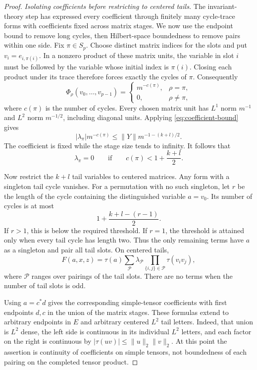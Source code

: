 \begin{proof}
\smallskip\noindent
\emph{Isolating coefficients before restricting to centered tails.}
The invariant-theory step has expressed every coefficient through
finitely many cycle-trace forms with coefficients fixed across matrix
stages. We now use the endpoint bound to remove long cycles, then
Hilbert-space boundedness to remove pairs within one side.
Fix $\pi\in S_p$.  Choose distinct matrix indices for the slots and
put $v_i=e_{i,\pi(i)}$.  In a nonzero product of these matrix units,
the variable in slot $i$ must be followed by the variable whose
initial index is $\pi(i)$.  Closing each product under its trace
therefore forces exactly the cycles of $\pi$.  Consequently
\[
 \Phi_\rho(v_0,\ldots,v_{p-1})
  =\begin{cases}
      m^{-c(\pi)},&\rho=\pi,\\
      0,&\rho\ne\pi,
    \end{cases}
\]
where $c(\pi)$ is the number of cycles.  Every chosen matrix unit
has $L^1$ norm $m^{-1}$ and $L^2$ norm $m^{-1/2}$, including
diagonal units.  Applying \eqref{eq:coefficient-bound} gives
\[
 |\lambda_\pi|m^{-c(\pi)}
       \leq\|Y\|m^{-1-(k+l)/2}.
\]
The coefficient is fixed while the stage size tends to infinity.
It follows that
\[
 \lambda_\pi=0\qquad\text{if}\qquad
 c(\pi)<1+\frac{k+l}{2}.
\]

Now restrict the $k+l$ tail variables to centered matrices.  Any
form with a singleton tail cycle vanishes.  For a permutation with
no such singleton, let $r$ be the length of the cycle containing the
distinguished variable $a=v_0$.  Its number of cycles is at most
\[
 1+\frac{k+l-(r-1)}2.
\]
If $r>1$, this is below the required threshold.  If $r=1$, the
threshold is attained only when every tail cycle has length two.
Thus the only remaining terms have $a$ as a singleton and pair all
tail slots.  On centered tails,
\[
 F(a,x,z)=\tau(a)
       \sum_{\mathcal P}\lambda_{\mathcal P}
          \prod_{\{i,j\}\in\mathcal P}\tau(v_i v_j),
\]
where $\mathcal P$ ranges over pairings of the tail slots.  There
are no terms when the number of tail slots is odd.

Using $a=c^*d$ gives the corresponding simple-tensor coefficients
with first endpoints $d,c$ in the union of the matrix stages.
These formulas extend to arbitrary endpoints in $E$ and arbitrary
centered $L^2$ tail letters.  Indeed, that union is $L^2$ dense,
the left side is continuous in its individual $L^2$ letters, and
each factor on the right is continuous by
$|\tau(uv)|\leq\|u\|_2\|v\|_2$.  At this point the assertion is
continuity of coefficients on simple tensors, not boundedness of
each pairing on the completed tensor product.


\end{proof}
